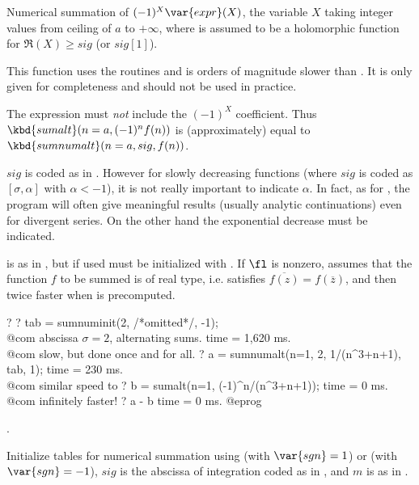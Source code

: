 \label{se:sumnumalt}
Numerical
summation of $(-1)^X\var{expr}(X)$, the variable $X$ taking integer values from
ceiling of $a$ to $+\infty$, where  is assumed to be a holomorphic
function for $\Re(X)\ge sig$ (or $sig[1]$).

 This function uses the  routines and is
orders of magnitude slower than . It is only given for
completeness and should not be used in practice.

 The expression  must \emph{not} include the
$(-1)^X$ coefficient. Thus $\kbd{sumalt}(n=a,(-1)^nf(n))$ is (approximately)
equal to $\kbd{sumnumalt}(n=a,sig,f(n))$.

$sig$ is coded as in . However for slowly decreasing functions
(where $sig$ is coded as $[\sigma,\alpha]$ with $\alpha<-1$), it is not
really important to indicate $\alpha$. In fact, as for , the
program will often give meaningful results (usually analytic continuations)
even for divergent series. On the other hand the exponential decrease must be
indicated.

 is as in , but if used must be initialized with
. If $\fl$ is nonzero, assumes that the function $f$ to be
summed is of real type, i.e. satisfies $\overline{f(z)}=f(\overline{z})$, and
then twice faster when  is precomputed.

\bprog
? 
? tab = sumnuminit(2, /*omitted*/, -1); \\@com abscissa $\sigma=2$, alternating sums.
time = 1,620 ms. \\@com slow, but done once and for all.
? a = sumnumalt(n=1, 2, 1/(n^3+n+1), tab, 1);
time = 230 ms. \\@com similar speed to 
? b = sumalt(n=1, (-1)^n/(n^3+n+1));
time = 0 ms. \\@com infinitely faster!
? a - b
time = 0 ms.
@eprog

.

\label{se:sumnuminit}
Initialize tables for numerical summation using  (with
$\var{sgn}=1$) or  (with $\var{sgn}=-1$), $sig$ is the
abscissa of integration coded as in , and $m$ is as in
.

